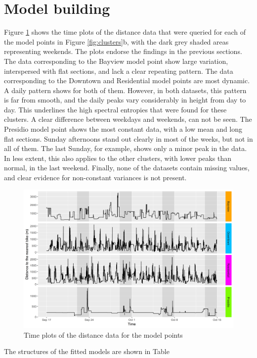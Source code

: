 \documentclass[12pt,oneside]{reedthesis}
\begin{document}
\section{Model building}\label{model-building}

Figure \ref{fig:timeplots} shows the time plots of the distance data
that were queried for each of the model points in Figure
\ref{fig:clusters}b, with the dark grey shaded areas representing
weekends. The plots endorse the findings in the previous sections. The
data corresponding to the Bayview model point show large variation,
interspersed with flat sections, and lack a clear repeating pattern. The
data corresponding to the Downtown and Residential model points are most
dynamic. A daily pattern shows for both of them. However, in both
datasets, this pattern is far from smooth, and the daily peaks vary
considerably in height from day to day. This underlines the high
spectral entropies that were found for these clusters. A clear
difference between weekdays and weekends, can not be seen. The Presidio
model point shows the most constant data, with a low mean and long flat
sections. Sunday afternoons stand out clearly in most of the weeks, but
not in all of them. The last Sunday, for example, shows only a minor
peak in the data. In less extent, this also applies to the other
clusters, with lower peaks than normal, in the last weekend. Finally,
none of the datasets contain missing values, and clear evidence for
non-constant variances is not present.
\begin{figure}[H]
\includegraphics[width=\textwidth]{Figures/timeplots} \caption{Time plots of the distance data for the model points}\label{fig:timeplots}
\end{figure}
The structures of the fitted models are shown in Table
\end{document}
